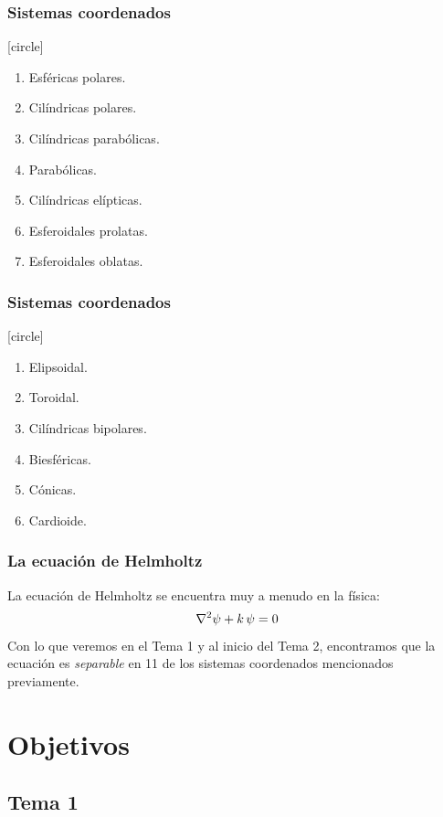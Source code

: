 \documentclass[12pt]{beamer}
\begin{document}
\begin{frame}
\frametitle{Sistemas coordenados}
[circle]
\begin{enumerate}[<+->]
\item Esféricas polares.
\item Cilíndricas polares.
\item Cilíndricas parabólicas.
\item Parabólicas.
\item Cilíndricas elípticas.
\item Esferoidales prolatas.
\item Esferoidales oblatas.
\seti
\end{enumerate}
\end{frame}
\begin{frame}
\frametitle{Sistemas coordenados}
[circle]
\begin{enumerate}[<+->]
\conti
\item Elipsoidal.
\item Toroidal.
\item Cilíndricas bipolares.
\item Biesféricas.
\item Cónicas.
\item Cardioide.
\end{enumerate}
\end{frame}
\begin{frame}
\frametitle{La ecuación de Helmholtz}
La ecuación de Helmholtz se encuentra muy a menudo en la física:
\pause
\begin{align*}
\laplacian{\psi} + k \, \psi = 0
\end{align*}
\pause
Con lo que veremos en el Tema 1 y al inicio del Tema 2, encontramos que la ecuación es \emph{separable} en 11 de los sistemas coordenados mencionados previamente.
\end{frame}

\section{Objetivos}
\subsection{Tema 1}
\end{document}

